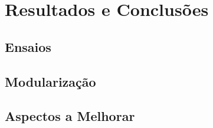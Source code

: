 \documentclass[11pt,fleqn]{book} %
\begin{document}

\chapter{Resultados e Conclusões}

\section{Ensaios}
\section{Modularização}
\section{Aspectos a Melhorar}

\vfill
\end{document}
